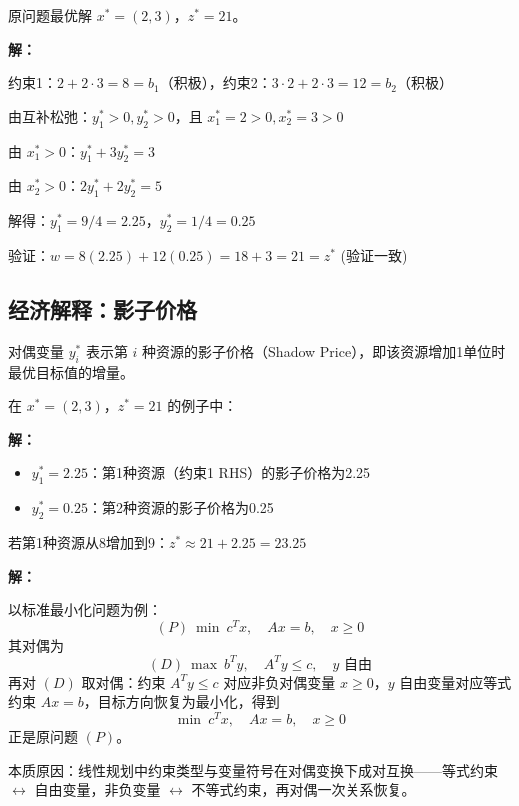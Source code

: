 \begin{example}[用互补松弛求对偶最优解]
原问题最优解 $x^* = (2, 3)$，$z^* = 21$。

\textbf{解：}

约束1：$2 + 2 \cdot 3 = 8 = b_1$（积极），约束2：$3 \cdot 2 + 2 \cdot 3 = 12 = b_2$（积极）

由互补松弛：$y_1^* > 0, y_2^* > 0$，且 $x_1^* = 2 > 0, x_2^* = 3 > 0$

由 $x_1^* > 0$：$y_1^* + 3y_2^* = 3$

由 $x_2^* > 0$：$2y_1^* + 2y_2^* = 5$

解得：$y_1^* = 9/4 = 2.25$，$y_2^* = 1/4 = 0.25$

验证：$w = 8(2.25) + 12(0.25) = 18 + 3 = 21 = z^*$ (验证一致)
\end{example}

\subsection{经济解释：影子价格}

\begin{definition}[影子价格]
对偶变量 $y_i^*$ 表示第 $i$ 种资源的影子价格（Shadow Price），即该资源增加1单位时最优目标值的增量。
\end{definition}

\begin{example}[影子价格]
在 $x^* = (2, 3)$，$z^* = 21$ 的例子中：

\textbf{解：}

\begin{itemize}
    \item $y_1^* = 2.25$：第1种资源（约束1 RHS）的影子价格为2.25
    \item $y_2^* = 0.25$：第2种资源的影子价格为0.25
\end{itemize}

若第1种资源从8增加到9：$z^* \approx 21 + 2.25 = 23.25$
\end{example}

\begin{example}[对偶的对偶是原问题]\label{ex:dual-of-dual}

\textbf{解：}

以标准最小化问题为例：
\[
(P)\ \min\ c^T x, \quad Ax = b, \quad x \geq 0
\]
其对偶为
\[
(D)\ \max\ b^T y, \quad A^T y \leq c, \quad y \text{ 自由}
\]
再对 $(D)$ 取对偶：约束 $A^T y \leq c$ 对应非负对偶变量 $x \geq 0$，$y$ 自由变量对应等式约束 $Ax = b$，目标方向恢复为最小化，得到
\[
\min\ c^T x, \quad Ax = b, \quad x \geq 0
\]
正是原问题 $(P)$。

本质原因：线性规划中约束类型与变量符号在对偶变换下成对互换——等式约束 $\leftrightarrow$ 自由变量，非负变量 $\leftrightarrow$ 不等式约束，再对偶一次关系恢复。
\end{example}

